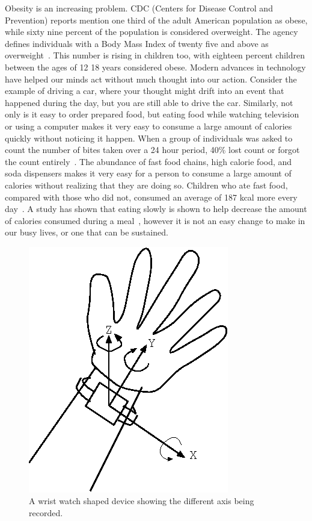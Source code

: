  Obesity is an increasing problem. CDC (Centers for Disease Control and Prevention) reports mention one
 \textemdash{} third of the adult American population as 
 obese, while sixty nine percent of the population is considered 
 overweight. The agency defines individuals with a Body Mass
 Index of twenty five and above as overweight~\cite{ogden2010prevalence}.
 This number is rising in children too, with eighteen
 percent children between the ages of 12 \textemdash{} 18
 years considered obese. Modern advances in technology
 have helped our minds act without much thought into our action.
 Consider the example of driving a car, where your thought might drift
 into an event that happened during the day, but you are still able to drive the car.
 Similarly, not only is it easy to order prepared food, but eating
 food while watching television or using a computer makes
 it very easy to consume a large amount of calories quickly without
 noticing it happen. When a group
 of individuals was asked to count the number of bites taken over
 a 24 hour period, 40\% lost count or forgot the count entirely~\cite{mahoney1975obese}.
 The abundance of fast food chains, high calorie food, and soda dispensers makes it very easy
 for a person to consume a large amount of calories without realizing 
 that they are doing so. Children who ate fast food, compared with those who did not,
 consumed an average of 187 kcal more every day~\cite{bowman2004effects}.
 A study has shown that eating slowly is shown to help decrease the amount of calories
 consumed during a meal~\cite{Andrade2008}, however it is not an
 easy change to make in our busy lives, or one that can be sustained.

\begin{figure}
\begin{center}
\includegraphics{images/HandAxis.eps}
\caption{A wrist watch shaped device showing the different axis being recorded.}
\label{fig:HandAxis}
\end{center}
\end{figure}
 
